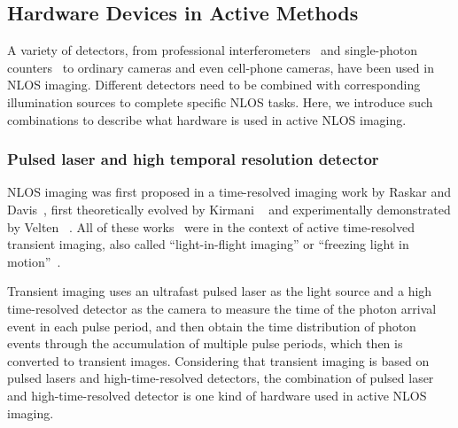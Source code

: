 \subsection{Hardware Devices in Active Methods}
A variety of detectors, from professional interferometers~\cite{xinTheoryFermatPaths2019} and single-photon counters~\cite{buttafavaNonlineofsightImagingUsing2015,wang2021non} to ordinary cameras and even cell-phone cameras, have been used in NLOS imaging. Different detectors need to be combined with corresponding illumination sources to complete specific NLOS tasks. Here, we introduce such combinations to describe what hardware is used in active NLOS imaging. 



\subsubsection{Pulsed laser and high temporal resolution detector}

NLOS imaging was first proposed in a time-resolved imaging work by Raskar and  Davis~\cite{raskar5dTimelightTransport2008}, first theoretically evolved by Kirmani \etal~\cite{kirmaniLookingCornerUsing2011} and experimentally demonstrated by Velten \etal~\cite{veltenRecoveringThreedimensionalShape2012}. All of these works~\cite{raskar5dTimelightTransport2008,kirmaniLookingCornerUsing2011,veltenRecoveringThreedimensionalShape2012} were in the context of active time-resolved transient imaging, also called ``light-in-flight imaging'' or ``freezing light in motion''~\cite{faccioNonlineofsightImaging2020}.

Transient imaging uses an ultrafast pulsed laser as the light source and a high time-resolved detector as the camera to measure the time of the photon arrival event in each pulse period, and then obtain the time distribution of photon events through the accumulation of multiple pulse periods, which then is converted to transient images.
Considering that transient imaging is based on pulsed lasers and high-time-resolved detectors, the combination of pulsed laser and high-time-resolved detector is one kind of hardware used in active NLOS imaging.  

